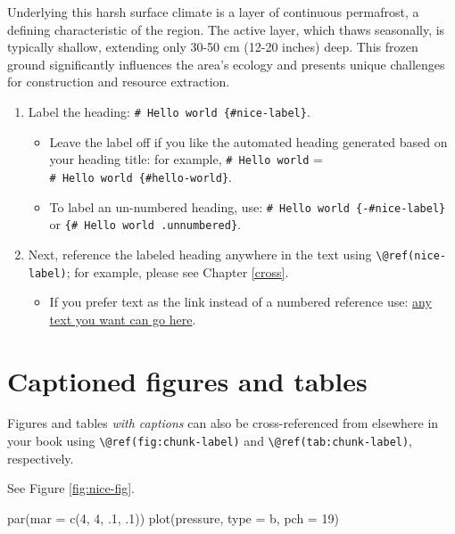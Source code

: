 \documentclass[
]{book}
\newenvironment{Shaded}{\begin{snugshade}}{\end{snugshade}}
\newcommand{\AttributeTok}[1]{\textcolor[rgb]{0.77,0.63,0.00}{#1}}
\newcommand{\DecValTok}[1]{\textcolor[rgb]{0.00,0.00,0.81}{#1}}
\newcommand{\FunctionTok}[1]{\textcolor[rgb]{0.00,0.00,0.00}{#1}}
\newcommand{\NormalTok}[1]{#1}
\newcommand{\StringTok}[1]{\textcolor[rgb]{0.31,0.60,0.02}{#1}}
\providecommand{\tightlist}{%
  \setlength{\itemsep}{0pt}\setlength{\parskip}{0pt}}
\theoremstyle{definition}
\theoremstyle{definition}
\theoremstyle{definition}
\theoremstyle{definition}
\theoremstyle{remark}
\begin{document}
Underlying this harsh surface climate is a layer of continuous permafrost, a defining characteristic of the region. The active layer, which thaws seasonally, is typically shallow, extending only 30-50 cm (12-20 inches) deep. This frozen ground significantly influences the area's ecology and presents unique challenges for construction and resource extraction.

\begin{enumerate}
\def\labelenumi{\arabic{enumi}.}
\tightlist
\item
  Label the heading: \texttt{\#\ Hello\ world\ \{\#nice-label\}}.

  \begin{itemize}
  \tightlist
  \item
    Leave the label off if you like the automated heading generated based on your heading title: for example, \texttt{\#\ Hello\ world} = \texttt{\#\ Hello\ world\ \{\#hello-world\}}.
  \item
    To label an un-numbered heading, use: \texttt{\#\ Hello\ world\ \{-\#nice-label\}} or \texttt{\{\#\ Hello\ world\ .unnumbered\}}.
  \end{itemize}
\item
  Next, reference the labeled heading anywhere in the text using \texttt{\textbackslash{}@ref(nice-label)}; for example, please see Chapter \ref{cross}.

  \begin{itemize}
  \tightlist
  \item
    If you prefer text as the link instead of a numbered reference use: \protect\hyperlink{cross}{any text you want can go here}.
  \end{itemize}
\end{enumerate}

\hypertarget{captioned-figures-and-tables}{%
\section{Captioned figures and tables}\label{captioned-figures-and-tables}}

Figures and tables \emph{with captions} can also be cross-referenced from elsewhere in your book using \texttt{\textbackslash{}@ref(fig:chunk-label)} and \texttt{\textbackslash{}@ref(tab:chunk-label)}, respectively.

See Figure \ref{fig:nice-fig}.

\begin{Shaded}
\begin{Highlighting}[]
\FunctionTok{par}\NormalTok{(}\AttributeTok{mar =} \FunctionTok{c}\NormalTok{(}\DecValTok{4}\NormalTok{, }\DecValTok{4}\NormalTok{, .}\DecValTok{1}\NormalTok{, .}\DecValTok{1}\NormalTok{))}
\FunctionTok{plot}\NormalTok{(pressure, }\AttributeTok{type =} \StringTok{\textquotesingle{}b\textquotesingle{}}\NormalTok{, }\AttributeTok{pch =} \DecValTok{19}\NormalTok{)}
\end{Highlighting}
\end{Shaded}
\end{document}
